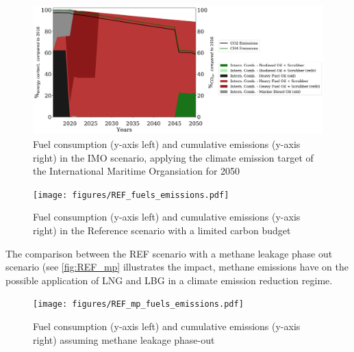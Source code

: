 \documentclass[article]{elsarticle}
\begin{document}
\begin{figure}[htb]
    \centering
    \includegraphics[width=\textwidth]{figures/IMO_fuels_emissions.pdf}
    \caption{Fuel consumption (y-axis left) and cumulative emissions (y-axis right) in the IMO scenario, applying the climate emission target of the International Maritime Organsiation for 2050}
    \label{fig:IMO}
\end{figure}

\begin{figure}[htb]
    \centering
    \texttt{[image: figures/REF\_fuels\_emissions.pdf]}
    \caption{Fuel consumption (y-axis left) and cumulative emissions (y-axis right) in the Reference scenario with a limited carbon budget}
    \label{fig:REF}
\end{figure}

The comparison between the REF scenario with a methane leakage phase out scenario (see \autoref{fig:REF_mp} illustrates the impact, methane emissions have on the possible application of LNG and LBG in a climate emission reduction regime.

\begin{figure}[htb]
    \centering
    \texttt{[image: figures/REF\_mp\_fuels\_emissions.pdf]}
    \caption{Fuel consumption (y-axis left) and cumulative emissions (y-axis right) assuming methane leakage phase-out}
    \label{fig:REF_mp}
\end{figure}
\end{document}
